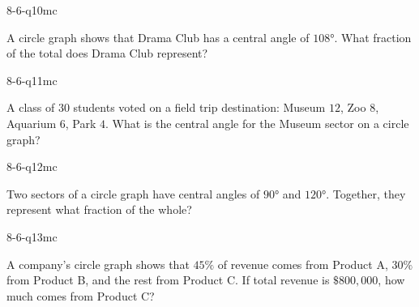\begin{practiceQuestion}{8-6-q10}{mc}
\begin{questionText}
A circle graph shows that Drama Club has a central angle of $108°$. What fraction of the total does Drama Club represent?
\end{questionText}
\end{practiceQuestion}

\begin{practiceQuestion}{8-6-q11}{mc}
\begin{questionText}
A class of $30$ students voted on a field trip destination: Museum $12$, Zoo $8$, Aquarium $6$, Park $4$. What is the central angle for the Museum sector on a circle graph?
\end{questionText}
\end{practiceQuestion}

\begin{practiceQuestion}{8-6-q12}{mc}
\begin{questionText}
Two sectors of a circle graph have central angles of $90°$ and $120°$. Together, they represent what fraction of the whole?
\end{questionText}
\end{practiceQuestion}

\begin{practiceQuestion}{8-6-q13}{mc}
\begin{questionText}
A company's circle graph shows that $45\%$ of revenue comes from Product A, $30\%$ from Product B, and the rest from Product C. If total revenue is $\$800{,}000$, how much comes from Product C?
\end{questionText}
\end{practiceQuestion}

